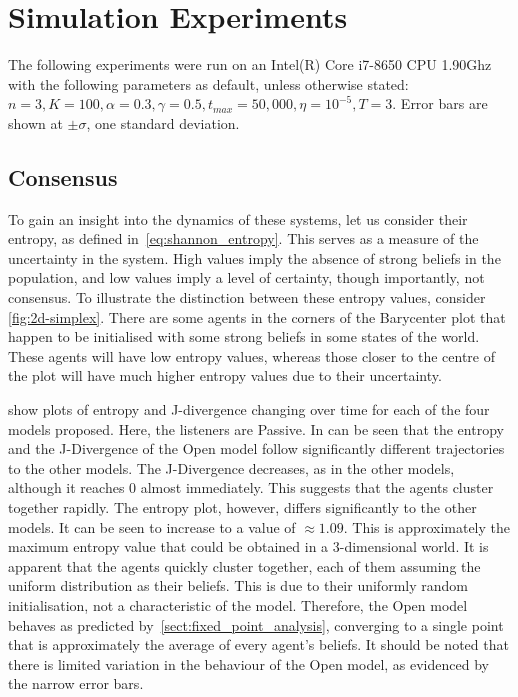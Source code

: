 \section{Simulation Experiments}

The following experiments were run on an Intel(R) Core i7-8650 CPU 1.90Ghz with the following parameters as default, unless otherwise stated: $n=3, K=100, \alpha = 0.3, \gamma = 0.5, t_{max} = 50,000, \eta = 10^{-5}, T=3$. Error bars are shown at $\pm \sigma$, one standard deviation. 
\subsection{Consensus}

To gain an insight into the dynamics of these systems, let us consider their entropy, as defined in~\cref{eq:shannon_entropy}. This serves as a measure of the uncertainty in the system. High values imply the absence of strong beliefs in the population, and low values imply a level of certainty, though importantly, not consensus. To illustrate the distinction between these entropy values, consider \cref{fig:2d-simplex}. There are some agents in the corners of the Barycenter plot that happen to be initialised with some strong beliefs in some states of the world. These agents will have low entropy values, whereas those closer to the centre of the plot will have much higher entropy values due to their uncertainty. 


 show plots of entropy and J-divergence changing over time for each of the four models proposed. Here, the listeners are Passive. In can be seen that the entropy and the J-Divergence of the Open model follow significantly different trajectories to the other models. The J-Divergence decreases, as in the other models, although it reaches $0$ almost immediately. This suggests that the agents cluster together rapidly. The entropy plot, however, differs significantly to the other models. It can be seen to increase to a value of $\approx 1.09$. This is approximately the maximum entropy value that could be obtained in a $3$-dimensional world. It is apparent that the agents quickly cluster together, each of them assuming the uniform distribution as their beliefs. This is due to their uniformly random initialisation, not a characteristic of the model. Therefore, the Open model behaves as predicted by~\cref{sect:fixed_point_analysis}, converging to a single point that is approximately the average of every agent's beliefs. It should be noted that there is limited variation in the behaviour of the Open model, as evidenced by the narrow error bars. 

